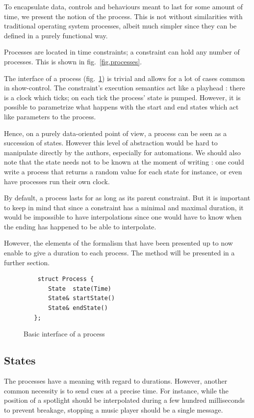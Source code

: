 \documentclass{sigchi}
\begin{document}
To encapsulate data, controls and behaviours meant to last for some amount of time, we present the notion of the process. This is not without similarities with traditional operating system processes, albeit much simpler since they can be defined in a purely functional way.

Processes are located in time constraints; a constraint can hold any number of processes. This is shown in fig.~\ref{fig.processes}.

The interface of a process (fig.~\ref{fig.processInterface}) is trivial and allows for a lot of cases common in show-control. The constraint's execution semantics act like a playhead : there is a clock which ticks; on each tick the process' state is pumped. However, it is possible to parametrize what happens with the start and end states which act like parameters to the process. 

Hence, on a purely data-oriented point of view, a process can be seen as a succession of states. However this level of abstraction would be hard to manipulate directly by the authors, especially for automations. We should also note that the state needs not to be known at the moment of writing : one could write a process that returns a random value for each state for instance, or even have processes run their own clock.

By default, a process lasts for as long as its parent constraint. But it is important to keep in mind that since a constraint has a minimal and maximal duration, it would be impossible to have interpolations since one would have to know when the ending has happened to be able to interpolate. 

However, the elements of the formalism that have been presented up to now enable to give a duration to each process. The method will be presented in a further section.

\begin{figure}
	\centering
\begin{lstlisting}
    struct Process {
       State  state(Time)
       State& startState()
       State& endState()
   };
\end{lstlisting}
\caption{Basic interface of a process}
\label{fig.processInterface}
\end{figure}

\subsection{States}
The processes have a meaning with regard to durations. However, another common necessity is to send cues at a precise time. For instance, while the position of a spotlight should be interpolated during a few hundred milliseconds to prevent breakage, stopping a music player should be a single message.
\end{document}
